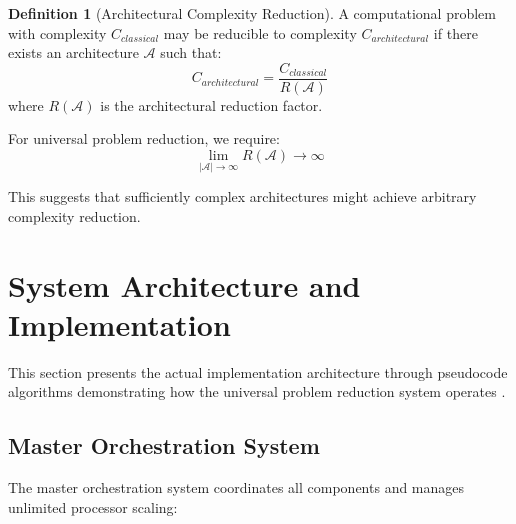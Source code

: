 \documentclass[12pt,a4paper]{article}
\theoremstyle{definition}
\newtheorem{definition}{Definition}[section]
\begin{document}
{\begin{definition}[Architectural Complexity Reduction]
A computational problem with complexity $C_{classical}$ may be reducible to complexity $C_{architectural}$ if there exists an architecture $\mathcal{A}$ such that:
\begin{equation}
C_{architectural} = \frac{C_{classical}}{R(\mathcal{A})}
\end{equation}
where $R(\mathcal{A})$ is the architectural reduction factor.
\end{definition}

For universal problem reduction, we require:
\begin{equation}
\lim_{|\mathcal{A}| \to \infty} R(\mathcal{A}) \to \infty
\end{equation}

This suggests that sufficiently complex architectures might achieve arbitrary complexity reduction.

\section{System Architecture and Implementation}

This section presents the actual implementation architecture through pseudocode algorithms demonstrating how the universal problem reduction system operates \cite{sachikonye2024implementations}.

\subsection{Master Orchestration System}

The master orchestration system coordinates all components and manages unlimited processor scaling:

}
\end{document}
